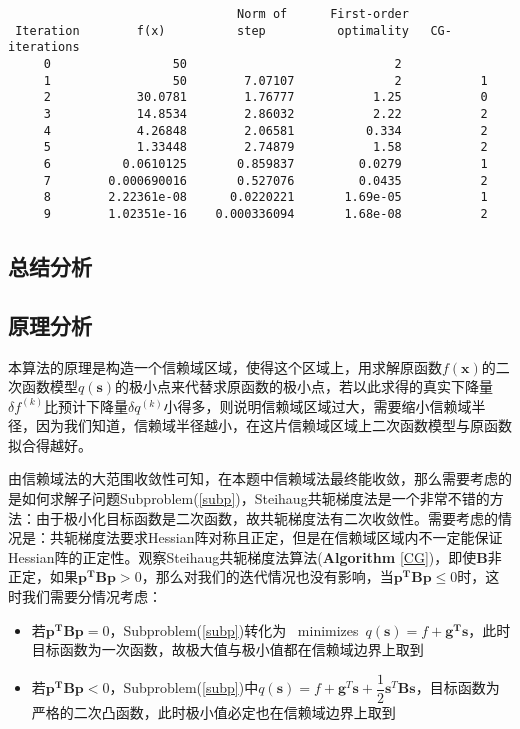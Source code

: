 \begin{lstlisting}
                                Norm of      First-order 
 Iteration        f(x)          step          optimality   CG-iterations
     0                 50                             2                
     1                 50        7.07107              2           1
     2            30.0781        1.76777           1.25           0
     3            14.8534        2.86032           2.22           2
     4            4.26848        2.06581          0.334           2
     5            1.33448        2.74879           1.58           2
     6          0.0610125       0.859837         0.0279           1
     7        0.000690016       0.527076         0.0435           2
     8        2.22361e-08      0.0220221       1.69e-05           1
     9        1.02351e-16    0.000336094       1.68e-08           2
\end{lstlisting}

\newpage
\subsection{总结分析}
\subsection*{原理分析}
本算法的原理是构造一个信赖域区域，使得这个区域上，用求解原函数$f(\bm{x})$的二次函数模型$q(\bm{s})$的极小点来代替求原函数的极小点，若以此求得的真实下降量$\delta f^{(k)}$比预计下降量$\delta q^{(k)}$小得多，则说明信赖域区域过大，需要缩小信赖域半径，因为我们知道，信赖域半径越小，在这片信赖域区域上二次函数模型与原函数拟合得越好。

由信赖域法的大范围收敛性可知，在本题中信赖域法最终能收敛，那么需要考虑的是如何求解子问题Subproblem(\ref{subp})，Steihaug共轭梯度法是一个非常不错的方法：由于极小化目标函数是二次函数，故共轭梯度法有二次收敛性。需要考虑的情况是：共轭梯度法要求Hessian阵对称且正定，但是在信赖域区域内不一定能保证Hessian阵的正定性。观察Steihaug共轭梯度法算法(\textbf{Algorithm} \ref{CG})，即使$\bm{B}$非正定，如果$\bm{p^TBp}>0$，那么对我们的迭代情况也没有影响，当$\bm{p^TBp}\leq 0$时，这时我们需要分情况考虑：

\begin{itemize}
\item
若$\bm{p^TBp}=0$，Subproblem(\ref{subp})转化为 \ minimizes\ $q(\bm{s})=f+\bm{g^Ts}$，此时目标函数为一次函数，故极大值与极小值都在信赖域边界上取到

\item
若$\bm{p^TBp}<0$，Subproblem(\ref{subp})中$q(\bm{s})=f+\bm{g}^{T}\bm{s}+\dfrac{1}{2}\bm{s}^T\bm{Bs}$，目标函数为严格的二次凸函数，此时极小值必定也在信赖域边界上取到
\end{itemize}

